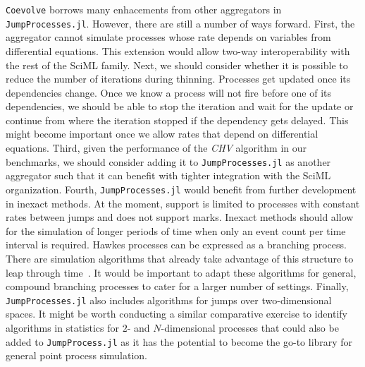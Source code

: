 \documentclass{juliacon}
\begin{document}
\texttt{Coevolve} borrows many enhacements from other aggregators in \texttt{JumpProcesses.jl}. However, there are still a number of ways forward. First, the aggregator cannot simulate processes whose rate depends on variables from differential equations. This extension would allow two-way interoperability with the rest of the SciML family. Next, we should consider whether it is possible to reduce the number of iterations during thinning. Processes get updated once its dependencies change. Once we know a process will not fire before one of its dependencies, we should be able to stop the iteration and wait for the update or continue from where the iteration stopped if the dependency gets delayed. This might become important once we allow rates that depend on differential equations. Third, given the performance of the \textit{CHV} algorithm in our benchmarks, we should consider adding it to \texttt{JumpProcesses.jl} as another aggregator such that it can benefit with tighter integration with the SciML organization. Fourth, \texttt{JumpProcesses.jl} would benefit from further development in inexact methods. At the moment, support is limited to processes with constant rates between jumps and does not support marks. Inexact methods should allow for the simulation of longer periods of time when only an event count per time interval is required. Hawkes processes can be expressed as a branching process. There are simulation algorithms that already take advantage of this structure to leap through time~\cite{laub2021}. It would be important to adapt these algorithms for general, compound branching processes to cater for a larger number of settings. Finally, \texttt{JumpProcesses.jl} also includes algorithms for jumps over two-dimensional spaces. It might be worth conducting a similar comparative exercise to identify algorithms in statistics for \(2 \)- and \( N \)-dimensional processes that could also be added to \texttt{JumpProcess.jl} as it has the potential to become the go-to library for general point process simulation.



\end{document}
